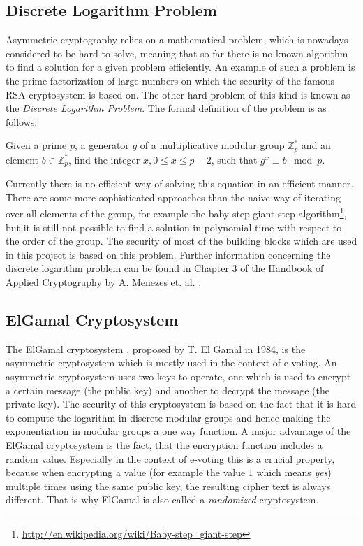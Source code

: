 \documentclass[numbers=noenddot, abstract=on, a4paper, headsepline,
footsepline, oneside, openright, draft=off, listof=leveldown]{scrreprt}
\begin{document}
\subsection{Discrete Logarithm Problem}
\label{sec:discretelogarithm}
Asymmetric cryptography relies on a mathematical problem, which is nowadays
considered to be hard to solve, meaning that so far there is no known algorithm
to find a solution for a given problem efficiently. An example of such a problem
is the prime factorization of large numbers on which the security of the famous
RSA cryptosystem \cite{RSA78} is based on. The other hard problem of this kind
is known as the \emph{Discrete Logarithm Problem}. The formal definition of
the problem is as follows: 

Given a prime $p$, a generator $g$ of a multiplicative modular group
$\mathbb{Z}^*_p$ and an element $b \in \mathbb{Z}^*_p$, find the integer $x,0
\leq x \leq p - 2$, such that $g^x \equiv b \mod p$.

Currently there is no efficient way of solving this equation in an efficient
manner. There are some more sophisticated approaches than the naive way of
iterating over all elements of the group, for example the baby-step giant-step
algorithm\footnote{\url{http://en.wikipedia.org/wiki/Baby-step_giant-step}}, but
it is still not possible to find a solution in polynomial time with respect to
the order of the group. The security of most of the building blocks which are
used in this project is based on this problem. Further information concerning
the discrete logarithm problem can be found in Chapter 3 of the Handbook of Applied
Cryptography by A. Menezes et. al.
\cite{book:hac}.

\subsection{ElGamal Cryptosystem}
\label{sec:elgamal}
The ElGamal cryptosystem \cite{EG84}, proposed by T. El Gamal in 1984, is the
asymmetric cryptosystem which is mostly used in the context of e-voting. An
asymmetric cryptosystem uses two keys to operate, one which is used to encrypt a
certain message (the public key) and another to decrypt the message (the private
key). The security of this cryptosystem is based on the fact that it is hard to
compute the logarithm in discrete modular groups and hence making the
exponentiation in modular groups a one way function. A major advantage of the
ElGamal cryptosystem is the fact, that the encryption function includes a random
value. Especially in the context of e-voting this is a crucial property, because
when encrypting a value (for example the value $1$ which means \textit{yes})
multiple times using the same public key, the resulting cipher text is always
different. That is why ElGamal is also called a \textit{randomized}
cryptosystem.
\end{document}
